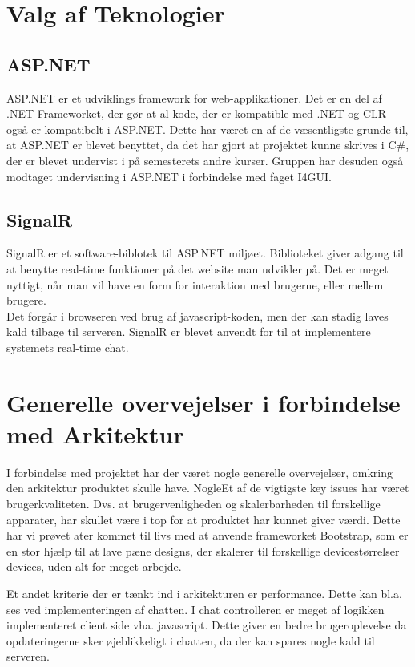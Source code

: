 \section{Valg af Teknologier}
\subsection{ASP.NET}
ASP.NET er et udviklings framework for web-applikationer.
Det er en del af .NET Frameworket, der gør at al kode, der er  kompatible med .NET og CLR også er kompatibelt i ASP.NET. Dette har været en af de væsentligste grunde til, at ASP.NET er blevet benyttet, da det har gjort at projektet kunne skrives i C\#, der er blevet undervist i på semesterets andre kurser. Gruppen har desuden også modtaget undervisning i ASP.NET i forbindelse med faget I4GUI.

\subsection{SignalR}
SignalR er et software-biblotek til ASP.NET miljøet. Biblioteket giver adgang til at benytte real-time funktioner på det website man udvikler på. Det er meget nyttigt, når man vil have en form for interaktion med brugerne, eller mellem brugere. \\
Det forgår i browseren ved brug af javascript-koden, men der kan stadig laves kald tilbage til serveren. 
SignalR er blevet anvendt for til at implementere systemets real-time chat.

\section{Generelle overvejelser i forbindelse med Arkitektur}
I forbindelse med projektet har der været nogle generelle overvejelser, omkring den arkitektur produktet skulle have. NogleEt af de vigtigste key issues har været brugerkvaliteten. Dvs. at brugervenligheden og skalerbarheden til forskellige apparater, har skullet være i top for at produktet har kunnet giver værdi. Dette har vi prøvet ater kommet til livs med at anvende frameworket Bootstrap, som er en stor hjælp til at lave pæne designs, der skalerer til forskellige devicestørrelser devices,  uden alt for meget arbejde. 

Et andet kriterie der er tænkt ind i arkitekturen er performance. Dette kan bl.a. ses ved implementeringen af chatten. I chat controlleren er meget af logikken implementeret client side vha. javascript. Dette giver en bedre brugeroplevelse da opdateringerne sker øjeblikkeligt i chatten, da der kan spares nogle kald til serveren.

